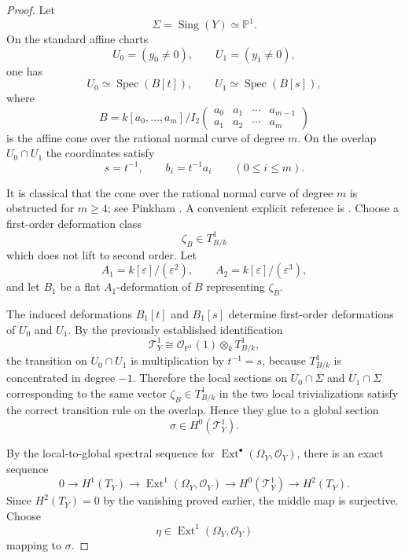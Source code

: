 \documentclass[11pt,twoside]{amsart}
\theoremstyle{plain}
\numberwithin{equation}{section}
\theoremstyle{definition}
\begin{document}
\begin{proof}
Let
\[
\Sigma=\operatorname{Sing}(Y)\simeq \mathbb{P}^{1}.
\]
On the standard affine charts
\[
U_{0}=(y_{0}\neq 0),\qquad U_{1}=(y_{1}\neq 0),
\]
one has
\[
U_{0}\simeq \operatorname{Spec}(B[t]),\qquad U_{1}\simeq \operatorname{Spec}(B[s]),
\]
where
\[
B=
k[a_{0},\dots,a_{m}]
\Big/
I_{2}\!\begin{pmatrix}
a_{0}&a_{1}&\cdots&a_{m-1}\\
a_{1}&a_{2}&\cdots&a_{m}
\end{pmatrix}
\]
is the affine cone over the rational normal curve of degree \(m\). On the overlap
\(U_{0}\cap U_{1}\) the coordinates satisfy
\[
s=t^{-1},\qquad b_{i}=t^{-1}a_{i}\qquad (0\leq i\leq m).
\]

It is classical that the cone over the rational normal curve of degree \(m\) is obstructed
for \(m\geq 4\); see Pinkham \cite[Chapter~8]{Pinkham}. A convenient explicit reference is
\cite{CilibertoLopezMiranda}. Choose a first-order deformation class
\[
\zeta_{B}\in T^{1}_{B/k}
\]
which does not lift to second order. Let
\[
A_{1}=k[\varepsilon]/(\varepsilon^{2}),\qquad A_{2}=k[\varepsilon]/(\varepsilon^{3}),
\]
and let \(B_{1}\) be a flat \(A_{1}\)-deformation of \(B\) representing \(\zeta_{B}\).

The induced deformations \(B_{1}[t]\) and \(B_{1}[s]\) determine first-order deformations
of \(U_{0}\) and \(U_{1}\). By the previously established identification
\[
\mathcal{T}^{1}_{Y}\cong \mathcal{O}_{\mathbb{P}^{1}}(1)\otimes_{k}T^{1}_{B/k},
\]
the transition on \(U_{0}\cap U_{1}\) is multiplication by \(t^{-1}=s\), because
\(T^{1}_{B/k}\) is concentrated in degree \(-1\). Therefore the local sections on
\(U_{0}\cap \Sigma\) and \(U_{1}\cap \Sigma\) corresponding to the same vector
\(\zeta_{B}\in T^{1}_{B/k}\) in the two local trivializations satisfy the correct transition
rule on the overlap. Hence they glue to a global section
\[
\sigma\in H^{0}(\mathcal{T}^{1}_{Y}).
\]

By the local-to-global spectral sequence for
\(\operatorname{Ext}^{\bullet}(\Omega_{Y},\mathcal{O}_{Y})\), there is an exact sequence
\[
0\longrightarrow H^{1}(T_{Y})
\longrightarrow \operatorname{Ext}^{1}(\Omega_{Y},\mathcal{O}_{Y})
\longrightarrow H^{0}(\mathcal{T}^{1}_{Y})
\longrightarrow H^{2}(T_{Y}).
\]
Since \(H^{2}(T_{Y})=0\) by the vanishing proved earlier, the middle map is surjective.
Choose
\[
\eta\in \operatorname{Ext}^{1}(\Omega_{Y},\mathcal{O}_{Y})
\]
mapping to \(\sigma\).


\end{proof}
\end{document}
